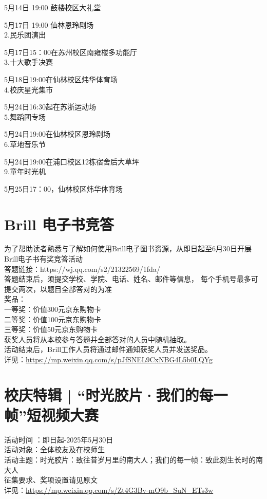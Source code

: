 \documentclass[letterpaper, 12pt]{article}
\begin{document}
\begin{multicols}{2}
5月14日 19:00 鼓楼校区大礼堂

5月17日 19:00 仙林恩玲剧场\\

2.民乐团演出

5月17日15：00在苏州校区南雍楼多功能厅\\

3.十大歌手决赛 

5月18日19:00在仙林校区炜华体育场\\

4.校庆星光集市

5月24日16:30起在苏浙运动场\\

5.舞蹈团专场

5月24日19:00在仙林校区恩玲剧场\\

6.草地音乐节 

5月24日19:00在浦口校区12栋宿舍后大草坪\\

9.童年时光机

5月25日17：00，仙林校区炜华体育场
\section{Brill 电子书竞答} %
为了帮助读者熟悉与了解如何使用Brill电子图书资源，从即日起至6月30日开展Brill电子书有奖竞答活动
\\答题链接：https://wj.qq.com/s2/21322569/1fda/
\\答题结束后，须提交学校、学院、电话、姓名、邮件等信息， 每个手机号最多可提交两次，以题目全部答对的为准
\\奖品：
\\一等奖：价值300元京东购物卡
\\二等奖：价值100元京东购物卡
\\三等奖：价值50元京东购物卡
\\获奖人员将从本校参与答题并全部答对的人员中随机抽取。
\\活动结束后，Brill工作人员将通过邮件通知获奖人员并发送奖品。
\\详见：\url{https://mp.weixin.qq.com/s/pJfSNEL9CxNBG4L5b0LQYg}



\section{校庆特辑 | “时光胶片·我们的每一帧”短视频大赛} %
活动时间 ：即日起-2025年5月30日
\\活动对象：全体校友及在校师生
\\活动主题：时光胶片：致往昔岁月里的南大人；我们的每一帧：致此刻生长时的南大人
\\征集要求、奖项设置请见原文
\\详见：\url{https://mp.weixin.qq.com/s/Zt4G3Bv-mO9b_SuN_ETs3w}


\end{multicols}
\end{document}
